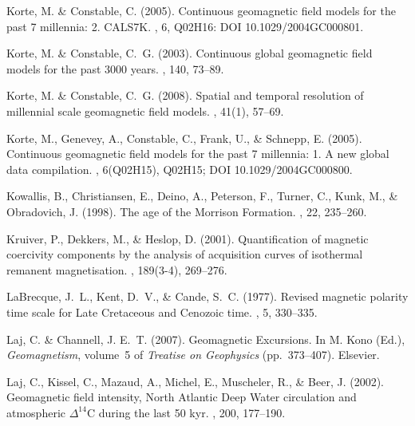 \documentclass[11pt]{book}
\begin{document}
\begin{thebibliography}{}
Korte, M. \& Constable, C. (2005).
\newblock Continuous geomagnetic field models for the past 7 millennia: 2.
  CALS7K.
, 6, Q02H16: DOI
  10.1029/2004GC000801.

Korte, M. \& Constable, C.~G. (2003).
\newblock Continuous global geomagnetic field models for the past 3000 years.
, 140, 73--89.

Korte, M. \& Constable, C.~G. (2008).
\newblock Spatial and temporal resolution of millennial scale geomagnetic field
  models.
, 41(1), 57--69.

Korte, M., Genevey, A., Constable, C., Frank, U., \& Schnepp, E. (2005).
\newblock Continuous geomagnetic field models for the past 7 millennia: 1. A
  new global data compilation.
, 6(Q02H15), Q02H15; DOI
  10.1029/2004GC000800.

Kowallis, B., Christiansen, E., Deino, A., Peterson, F., Turner, C., Kunk, M.,
  \& Obradovich, J. (1998).
\newblock The age of the Morrison Formation.
, 22, 235--260.

Kruiver, P., Dekkers, M., \& Heslop, D. (2001).
\newblock Quantification of magnetic coercivity components by the analysis of
  acquisition curves of isothermal remanent magnetisation.
, 189(3-4), 269--276.

LaBrecque, J.~L., Kent, D.~V., \& Cande, S.~C. (1977).
\newblock Revised magnetic polarity time scale for Late Cretaceous and Cenozoic
  time.
, 5, 330--335.

Laj, C. \& Channell, J. E.~T. (2007).
\newblock Geomagnetic Excursions.
\newblock In M. Kono (Ed.), {\em Geomagnetism}, volume~5 of {\em Treatise on
  Geophysics}  (pp.\ 373--407). Elsevier.

Laj, C., Kissel, C., Mazaud, A., Michel, E., Muscheler, R., \& Beer, J. (2002).
\newblock Geomagnetic field intensity, North Atlantic Deep Water circulation
  and atmospheric $\Delta^{14}$C during the last 50 kyr.
, 200, 177--190.


\end{thebibliography}
\end{document}
